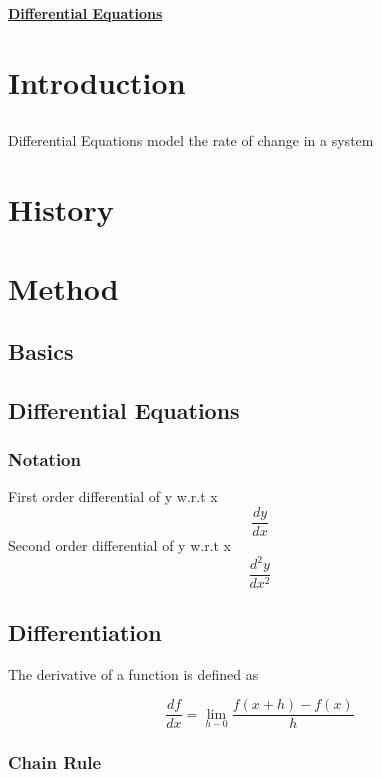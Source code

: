 \documentclass[10pt,a4paper]{report}
\begin{document}
	\begin{center}
		\underline{\textbf{Differential Equations}}
	\end{center}

\part{Introduction}
\chapter{}
Differential Equations model the rate of change in a system
\part{History}
\part{Method}
\chapter{Basics}
\chapter{Differential Equations}
\section{Notation}
First order differential of y w.r.t x
\begin{equation}
	\frac{dy}{dx}
\end{equation}
Second order differential of y w.r.t x
\begin{equation}
	\frac{d^2y}{dx^2}
\end{equation}

\chapter{Differentiation}

The derivative of a function is defined as

\begin{equation}
	\frac{df}{dx} = \lim\limits_{h - 0} \frac{f (x + h) - f (x)}{h}
\end{equation}

\section{Chain Rule}
\end{document}
